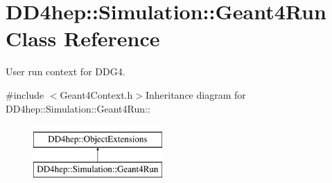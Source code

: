 \hypertarget{class_d_d4hep_1_1_simulation_1_1_geant4_run}{
\section{DD4hep::Simulation::Geant4Run Class Reference}
\label{class_d_d4hep_1_1_simulation_1_1_geant4_run}
}


User run context for DDG4.  


{\ttfamily \#include $<$Geant4Context.h$>$}Inheritance diagram for DD4hep::Simulation::Geant4Run::\begin{figure}[H]
\begin{center}
\leavevmode
\includegraphics[height=2cm]{class_d_d4hep_1_1_simulation_1_1_geant4_run}
\end{center}
\end{figure}
